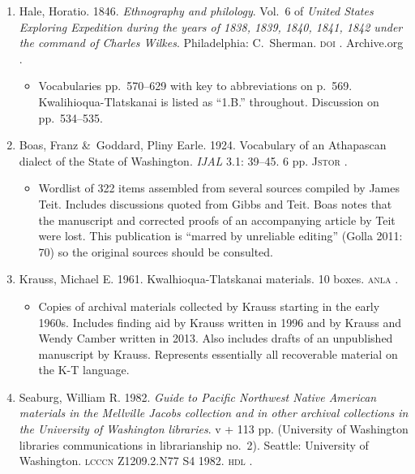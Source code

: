 \documentclass[12pt,letterpaper,oneside,article]{memoir}
\begin{document}
\begin{enumerate}
\item	Hale, Horatio.
	1846.
	\textit{Ethnography and philology}.
	Vol.\ 6 of \textit{United States Exploring Expedition during the years of 1838, 1839,
		1840, 1841, 1842 under the command of Charles Wilkes}.
	Philadelphia: C.\ Sherman.
	\textsc{doi} .
	Archive.org .
	\begin{itemize}
	\item	Vocabularies pp.\ 570–629 with key to abbreviations on p.\ 569.
		Kwalihioqua-Tlatskanai is listed as “1.B.” throughout.
		Discussion on pp.\ 534–535.
	\end{itemize}
\item	Boas, Franz \&\ Goddard, Pliny Earle.
	1924.
	Vocabulary of an Athapascan dialect of the State of Washington.
	\textit{IJAL} 3.1: 39–45.
	6 pp.
	\textsc{Jstor} .
	\begin{itemize}
	\item	Wordlist of 322 items assembled from several sources compiled by James Teit.
		Includes discussions quoted from Gibbs and Teit.
		Boas notes that the manuscript and corrected proofs of an accompanying
		article by Teit were lost.
		This publication is “marred by unreliable editing” (Golla 2011: 70) so
		the original sources should be consulted.
	\end{itemize}
\item	Krauss, Michael E.
	1961.
	Kwalhioqua-Tlatskanai materials.
	10 boxes.
	\textsc{anla} .
	\begin{itemize}
	\item	Copies of archival materials collected by Krauss starting in the early 1960s.
		Includes finding aid by Krauss written in 1996 and by Krauss and Wendy Camber
		written in 2013.
		Also includes drafts of an unpublished manuscript by Krauss.
		Represents essentially all recoverable material on the K-T language.
	\end{itemize}
\item	Seaburg, William R.
	1982.
	\textit{Guide to Pacific Northwest Native American materials in the Mellville Jacobs
		collection and in other archival collections in the University of Washington
		libraries}.
	v + 113 pp.
	(University of Washington libraries communications in librarianship no.\ 2).
	Seattle: University of Washington.
	\textsc{lcccn} Z1209.2.N77 S4 1982.
	\textsc{hdl} .
	\begin{itemize}

\end{itemize}
\end{enumerate}
\end{document}
